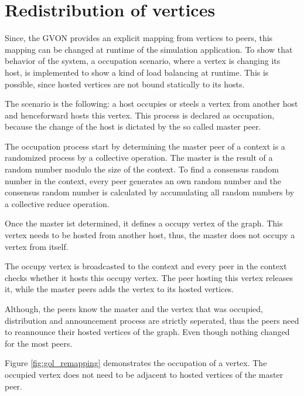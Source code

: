\section{Redistribution of vertices}

Since, the GVON provides an explicit mapping from vertices to peers,
this mapping can be changed at runtime of the simulation application.
To show that behavior of the system, a occupation scenario, where a
vertex is changing its host, is implemented to show a kind of load
balancing at runtime. This is possible, since hosted vertices are not
bound statically to its hosts.

The scenario is the following: a host occupies or steels a vertex
from another host and henceforward hosts this vertex.  This process
is declared as occupation, because the change of the host is
dictated by the so called master peer.

The occupation process start by determining the master peer of a
context is a randomized process by a collective operation. The
master is the result of a random number modulo the size of the
context. To find a consensus random number in the context, every
peer generates an own random number and the consensus random number
is calculated by accumulating all random numbers by a collective
reduce operation.

Once the master ist determined, it defines a occupy vertex of the
graph. This vertex needs to be hosted from another host, thus,
the master does not occupy a vertex from itself.

The occupy vertex is broadcasted to the context and every peer in
the context checks whether it hosts this occupy vertex. The peer
hosting this vertex releases it, while the master peers adds the vertex
to its hosted vertices.

Although, the peers know the master and the vertex that was
occupied, distribution and announcement process are strictly
seperated, thus the peers need to reannounce their hosted vertices
of the graph. Even though nothing changed for the most peers.


Figure \ref{fig:gol_remapping} demonstrates the occupation of a
vertex.  The occupied vertex does not need to be adjacent to hosted
vertices of the master peer.

